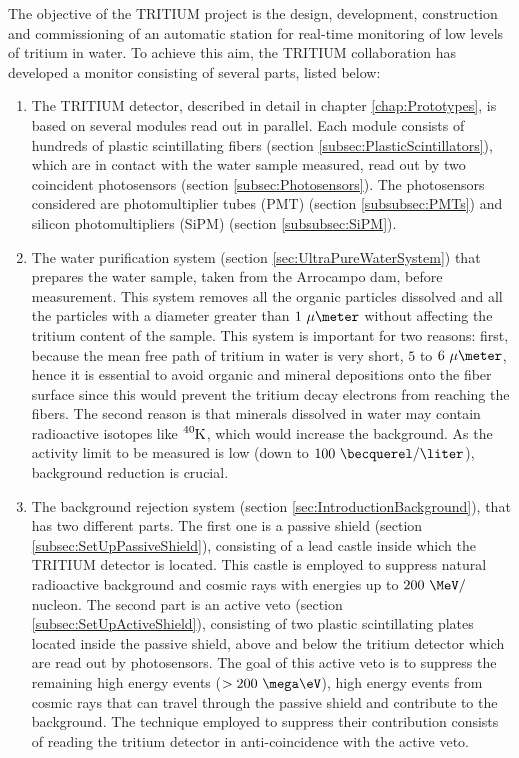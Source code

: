 The objective of the TRITIUM project is the design, development, construction and commissioning of an automatic station for real-time monitoring of low levels of tritium in water. To achieve this aim, the TRITIUM collaboration has developed a monitor consisting of several parts, listed below: 

\begin{enumerate}

\item{} The TRITIUM detector, described in detail in chapter \ref{chap:Prototypes}, is based on several modules read out in parallel. Each module consists of hundreds of plastic scintillating fibers (section \ref{subsec:PlasticScintillators}), which are in contact with the water sample measured, read out by two coincident photosensors (section \ref{subsec:Photosensors}). The photosensors considered are photomultiplier tubes (PMT) (section \ref{subsubsec:PMTs}) and silicon photomultipliers (SiPM) (section \ref{subsubsec:SiPM}).

\item{} The water purification system (section \ref{sec:UltraPureWaterSystem}) that prepares the water sample, taken from the Arrocampo dam, before measurement. This system removes all the organic particles dissolved and all the particles with a diameter greater than $1~\mu\meter$ without affecting the tritium content of the sample. This system is important for two reasons: first, because the mean free path of tritium in water is very short, $5$ to $6~\mu\meter$,  hence it is essential to avoid organic and mineral depositions onto the fiber surface since this would prevent the tritium decay electrons from reaching the fibers. The second reason is that minerals dissolved in water may contain radioactive isotopes like $\ce{^{40}K}$, which would increase the background. As the activity limit to be measured is low (down to $100~\becquerel/\liter$), background reduction is crucial.

\item{} The background rejection system (section \ref{sec:IntroductionBackground}), that has two different parts. The first one is a passive shield (section \ref{subsec:SetUpPassiveShield}), consisting of a lead castle inside which the TRITIUM detector is located. This castle is employed to suppress natural radioactive background and cosmic rays with energies up to $200~\MeV/$nucleon. The second part is an active veto (section \ref{subsec:SetUpActiveShield}), consisting of two plastic scintillating plates located inside the passive shield, above and below the tritium detector which are read out by photosensors. The goal of this active veto is to suppress the remaining high energy events ($>200~\mega\eV$), high energy events from cosmic rays that can travel through the passive shield and contribute to the background. The technique employed to suppress their contribution consists of reading the tritium detector in anti-coincidence with the active veto.


\end{enumerate}
